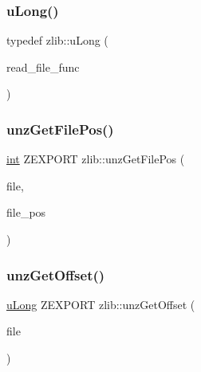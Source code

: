 \mbox{\label{namespacezlib_a3bc0123d9337acd75d286df79e6cf7da}} 
\subsubsection{\texorpdfstring{u\+Long()}{uLong()}}
{\footnotesize\ttfamily typedef zlib\+::u\+Long (\begin{DoxyParamCaption}\item[{\hyperlink{ioapi_8h_aace96475a6dd2915bc55bc542d7aa8a5}{Z\+C\+A\+L\+L\+B\+A\+CK} $\ast$}]{read\+\_\+file\+\_\+func }\end{DoxyParamCaption})}

\mbox{\label{namespacezlib_a47437b346d579699d430dc268e4590e9}} 
\subsubsection{\texorpdfstring{unz\+Get\+File\+Pos()}{unzGetFilePos()}}
{\footnotesize\ttfamily \hyperlink{namespacezlib_a0c9da18d93722fcf02a354ae2b6ec1ba}{int} Z\+E\+X\+P\+O\+RT zlib\+::unz\+Get\+File\+Pos (\begin{DoxyParamCaption}\item[{\hyperlink{namespacezlib_a48c1eb530e72d2132ea9cb6648f4047e}{unz\+File}}]{file,  }\item[{\hyperlink{namespacezlib_aafe5edb16e400a11811c203048d2f464}{unz\+\_\+file\+\_\+pos} $\ast$}]{file\+\_\+pos }\end{DoxyParamCaption})}

\mbox{\label{namespacezlib_a0a1cdabde1d4c3e15a1a3fe74ad6316e}} 
\subsubsection{\texorpdfstring{unz\+Get\+Offset()}{unzGetOffset()}}
{\footnotesize\ttfamily \hyperlink{namespacezlib_a3bc0123d9337acd75d286df79e6cf7da}{u\+Long} Z\+E\+X\+P\+O\+RT zlib\+::unz\+Get\+Offset (\begin{DoxyParamCaption}\item[{\hyperlink{namespacezlib_a48c1eb530e72d2132ea9cb6648f4047e}{unz\+File}}]{file }\end{DoxyParamCaption})}

